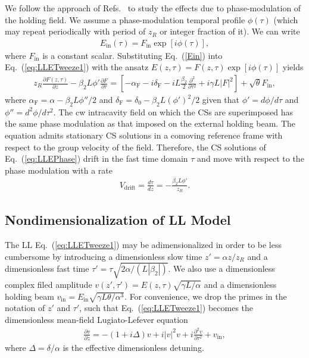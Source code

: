 We follow the approach of Refs.~\cite{tweeze,firth96} to study the effects due to phase-modulation of the holding field.  We assume a phase-modulation temporal profile $\phi(\tau)$ (which may repeat periodically with period of $z_R$ or integer fraction of it).  We can write 
\begin{align}
E_{\mathrm{in}} (\tau) = F_{\mathrm{in}} \exp[i \phi(\tau)], \label{Ein}
\end{align}
where $F_{\mathrm{in}}$ is a constant scalar.  Substituting Eq.~(\ref{Ein}) into Eq.~(\ref{eq:LLETweeze1}) with the ansatz $E(z, \tau) = F(z, \tau) \exp[i \phi(\tau)]$ yields
\begin{align}
z_R \frac{\partial F(z,\tau)}{\partial z} - \beta_2 L \phi' \frac{\partial F}{\partial \tau} = \left[ - \alpha_{\mathrm{F}} - i \delta_{\mathrm{F}} - i L \frac{\beta_2}{2} \frac{\partial^2}{\partial \tau^2} + i \gamma L |F|^2 \right] + \sqrt{\theta} F_{\mathrm{in}},
\label{eq:LLEPhase}
\end{align}
where $\alpha_{\mathrm{F}} = \alpha - \beta_2 L \phi''/ 2$ and $\delta_{\mathrm{F}} = \delta_0 - \beta_2 L (\phi')^2/2$ given that  $\phi' = d\phi/d\tau$ and $\phi'' = d^2 \phi/ d \tau^2$.  The cw intracavity field on which the CSs are superimposed has the same phase modulation as that imposed on the external holding beam.  The equation admits stationary CS solutions in a comoving reference frame with respect to the group velocity of the field.  Therefore, the CS solutions of Eq.~(\ref{eq:LLEPhase}) drift in the fast time domain $\tau$ and move with respect to the phase modulation with a rate 
\begin{align}
V_{\mathrm{drift}} = \frac{d\tau}{d z} = - \frac{\beta_2 L \phi'}{z_R}.
\end{align}

\subsection{Nondimensionalization of LL Model}

The LL Eq.~(\ref{eq:LLETweeze1}) may be adimensionalized in order to be less cumbersome by introducing a dimensionless slow time $z' = \alpha z / z_R$ and a dimensionless fast time $\tau' = \tau \sqrt{2\alpha /(L |\beta_2|)}$.  We also use a dimensionless complex filed amplitude $v(z',\tau') = E(z,\tau) \sqrt{\gamma L/\alpha}$ and a dimensionless holding beam $v_{\mathrm{in}} = E_{\mathrm{in}}\sqrt{\gamma L \theta /\alpha^3}$.  For convenience, we drop the primes in the notation of $z'$ and $\tau'$, such that Eq.~(\ref{eq:LLETweeze1}) becomes the dimensionless mean-field Lugiato-Lefever equation 
\begin{align}
\frac{\partial v }{\partial z} = -(1+i \Delta) v + i |v|^2 v + i \frac{\partial^2 v }{\partial \tau^2} + v_{\mathrm{in}},
\label{eq:dimensionlessLLE}
\end{align}
where $\Delta = \delta/\alpha$ is the effective dimensionless detuning.  

